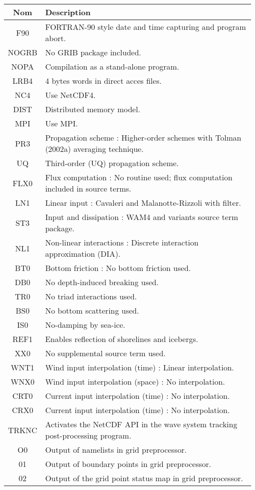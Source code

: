 \documentclass[10pt]{report}
\numberwithin{equation}{section}
\begin{document}
\begin{center}
\begin{tabular}{cl}
\hline
\hline
Nom & Description\\
\hline
F90 & FORTRAN-90 style date and time capturing and program abort.\\
NOGRB & No GRIB package included.\\
NOPA & Compilation as a stand-alone program.\\
LRB4 & 4 bytes words in direct acces files.\\
NC4 & Use NetCDF4.\\
DIST & Distributed memory model.\\
MPI & Use MPI.\\
PR3 & Propagation scheme : Higher-order schemes with Tolman (2002a) averaging technique.\\
UQ & Third-order (UQ) propagation scheme.\\
FLX0 & Flux computation : No routine used; flux computation included in source terms.\\
LN1 & Linear input : Cavaleri and Malanotte-Rizzoli with filter.\\
ST3 & Input and dissipation : WAM4 and variants source term package.\\
NL1 & Non-linear interactions : Discrete interaction approximation (DIA).\\
BT0 & Bottom friction : No bottom friction used.\\
DB0 & No depth-induced breaking used.\\
TR0 & No triad interactions used.\\
BS0 & No bottom scattering used.\\
IS0 & No-damping by sea-ice.\\
REF1 & Enables reflection of shorelines and icebergs.\\
XX0 & No supplemental source term used.\\
WNT1 & Wind input interpolation (time) : Linear interpolation.\\
WNX0 & Wind input interpolation (space) : No interpolation.\\
CRT0 & Current input interpolation (time) : No interpolation.\\
CRX0 & Current input interpolation (time) : No interpolation.\\
TRKNC & Activates the NetCDF API in the wave system tracking post-processing program.\\
O0 & Output of namelists in grid preprocessor.\\
01 & Output of boundary points in grid preprocessor.\\
02 & Output of the grid point status map in grid preprocessor.\\
\hline
\end{tabular}
\end{center}
\end{document}
